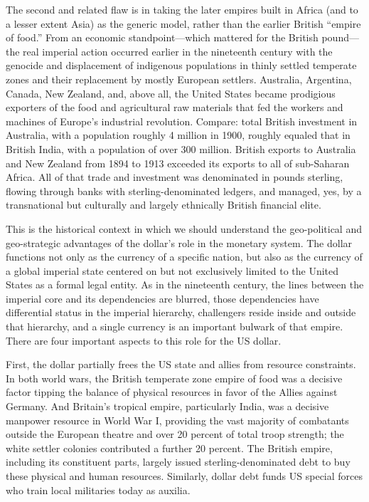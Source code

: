 \documentclass[
]{book}
\begin{document}
The second and related flaw is in taking the later empires built in Africa (and to a lesser extent Asia) as the generic model, rather than the earlier British ``empire of food.'' From an economic standpoint---which mattered for the British pound---the real imperial action occurred earlier in the nineteenth century with the genocide and displacement of indigenous populations in thinly settled temperate zones and their replacement by mostly European settlers. Australia, Argentina, Canada, New Zealand, and, above all, the United States became prodigious exporters of the food and agricultural raw materials that fed the workers and machines of Europe's industrial revolution. Compare: total British investment in Australia, with a population roughly 4 million in 1900, roughly equaled that in British India, with a population of over 300 million. British exports to Australia and New Zealand from 1894 to 1913 exceeded its exports to all of sub-Saharan Africa. All of that trade and investment was denominated in pounds sterling, flowing through banks with sterling-denominated ledgers, and managed, yes, by a transnational but culturally and largely ethnically British financial elite.

This is the historical context in which we should understand the geo-political and geo-strategic advantages of the dollar's role in the monetary system. The dollar functions not only as the currency of a specific nation, but also as the currency of a global imperial state centered on but not exclusively limited to the United States as a formal legal entity. As in the nineteenth century, the lines between the imperial core and its dependencies are blurred, those dependencies have differential status in the imperial hierarchy, challengers reside inside and outside that hierarchy, and a single currency is an important bulwark of that empire. There are four important aspects to this role for the US dollar.

First, the dollar partially frees the US state and allies from resource constraints. In both world wars, the British temperate zone empire of food was a decisive factor tipping the balance of physical resources in favor of the Allies against Germany. And Britain's tropical empire, particularly India, was a decisive manpower resource in World War I, providing the vast majority of combatants outside the European theatre and over 20 percent of total troop strength; the white settler colonies contributed a further 20 percent. The British empire, including its constituent parts, largely issued sterling-denominated debt to buy these physical and human resources. Similarly, dollar debt funds US special forces who train local militaries today as auxilia.
\end{document}
